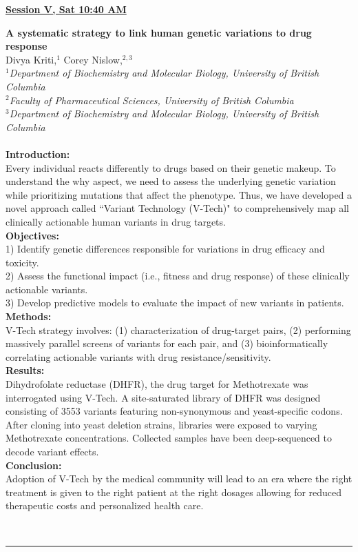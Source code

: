 \documentclass[titlepage,oneside,openany,10pt]{book}
\newenvironment{oralabs}[4] %
        {
        \begin{flushright}
                \underline{\textbf{#4}}
        \end{flushright}
        \textbf{#1}\\%
        #2\\%
        \textit{#3}\\\\%
        }
        {
        \\
        \noindent\rule{15cm}{0.5pt}%
        }
\begin{document}
\begin{oralabs}
    {A systematic strategy to link human genetic variations to drug response}
    {Divya Kriti,$^{1}$ Corey Nislow,$^{2,3}$}
    {
    $^1$Department of Biochemistry and Molecular Biology, University of British Columbia\\
    $^2$Faculty of Pharmaceutical Sciences, University of British Columbia\\
    $^3$Department of Biochemistry and Molecular Biology, University of British Columbia
    }
    {Session V, Sat 10:40 AM}
    \textbf{Introduction:}\\Every individual reacts differently to drugs based on their genetic makeup. To understand the why aspect, we need to assess the underlying genetic variation while prioritizing mutations that affect the phenotype. Thus, we have developed a novel approach called ``Variant Technology (V-Tech)" to comprehensively map all clinically actionable human variants in drug targets.\\\textbf{Objectives:}\\1) Identify genetic differences responsible for variations in drug efficacy and toxicity.\\2) Assess the functional impact (i.e., fitness and drug response) of these clinically actionable variants.\\3) Develop predictive models to evaluate the impact of new variants in patients.\\\textbf{Methods:}\\V-Tech strategy involves: (1) characterization of drug-target pairs, (2) performing massively parallel screens of variants for each pair, and (3) bioinformatically correlating actionable variants with drug resistance/sensitivity.\\\textbf{Results:}\\Dihydrofolate reductase (DHFR), the drug target for Methotrexate was interrogated using V-Tech. A site-saturated library of DHFR was designed consisting of 3553 variants featuring non-synonymous and yeast-specific codons. After cloning into yeast deletion strains, libraries were exposed to varying Methotrexate concentrations. Collected samples have been deep-sequenced to decode variant effects.\\\textbf{Conclusion:}\\Adoption of V-Tech by the medical community will lead to an era where the right treatment is given to the right patient at the right dosages allowing for reduced therapeutic costs and personalized health care.
    \label{KritiD}
\end{oralabs}
\end{document}
